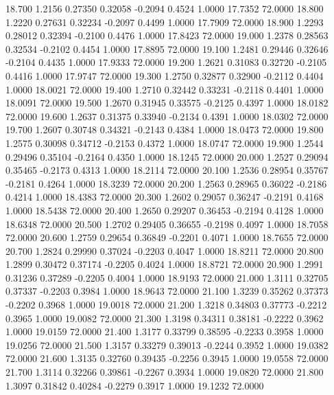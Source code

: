   18.700   1.2156   0.27350   0.32058  -0.2094   0.4524   1.0000  17.7352  72.0000
  18.800   1.2220   0.27631   0.32234  -0.2097   0.4499   1.0000  17.7909  72.0000
  18.900   1.2293   0.28012   0.32394  -0.2100   0.4476   1.0000  17.8423  72.0000
  19.000   1.2378   0.28563   0.32534  -0.2102   0.4454   1.0000  17.8895  72.0000
  19.100   1.2481   0.29446   0.32646  -0.2104   0.4435   1.0000  17.9333  72.0000
  19.200   1.2621   0.31083   0.32720  -0.2105   0.4416   1.0000  17.9747  72.0000
  19.300   1.2750   0.32877   0.32900  -0.2112   0.4404   1.0000  18.0021  72.0000
  19.400   1.2710   0.32442   0.33231  -0.2118   0.4401   1.0000  18.0091  72.0000
  19.500   1.2670   0.31945   0.33575  -0.2125   0.4397   1.0000  18.0182  72.0000
  19.600   1.2637   0.31375   0.33940  -0.2134   0.4391   1.0000  18.0302  72.0000
  19.700   1.2607   0.30748   0.34321  -0.2143   0.4384   1.0000  18.0473  72.0000
  19.800   1.2575   0.30098   0.34712  -0.2153   0.4372   1.0000  18.0747  72.0000
  19.900   1.2544   0.29496   0.35104  -0.2164   0.4350   1.0000  18.1245  72.0000
  20.000   1.2527   0.29094   0.35465  -0.2173   0.4313   1.0000  18.2114  72.0000
  20.100   1.2536   0.28954   0.35767  -0.2181   0.4264   1.0000  18.3239  72.0000
  20.200   1.2563   0.28965   0.36022  -0.2186   0.4214   1.0000  18.4383  72.0000
  20.300   1.2602   0.29057   0.36247  -0.2191   0.4168   1.0000  18.5438  72.0000
  20.400   1.2650   0.29207   0.36453  -0.2194   0.4128   1.0000  18.6348  72.0000
  20.500   1.2702   0.29405   0.36655  -0.2198   0.4097   1.0000  18.7058  72.0000
  20.600   1.2759   0.29654   0.36849  -0.2201   0.4071   1.0000  18.7655  72.0000
  20.700   1.2824   0.29990   0.37024  -0.2203   0.4047   1.0000  18.8211  72.0000
  20.800   1.2899   0.30472   0.37174  -0.2205   0.4024   1.0000  18.8721  72.0000
  20.900   1.2991   0.31236   0.37289  -0.2205   0.4004   1.0000  18.9193  72.0000
  21.000   1.3111   0.32705   0.37337  -0.2203   0.3984   1.0000  18.9643  72.0000
  21.100   1.3239   0.35262   0.37373  -0.2202   0.3968   1.0000  19.0018  72.0000
  21.200   1.3218   0.34803   0.37773  -0.2212   0.3965   1.0000  19.0082  72.0000
  21.300   1.3198   0.34311   0.38181  -0.2222   0.3962   1.0000  19.0159  72.0000
  21.400   1.3177   0.33799   0.38595  -0.2233   0.3958   1.0000  19.0256  72.0000
  21.500   1.3157   0.33279   0.39013  -0.2244   0.3952   1.0000  19.0382  72.0000
  21.600   1.3135   0.32760   0.39435  -0.2256   0.3945   1.0000  19.0558  72.0000
  21.700   1.3114   0.32266   0.39861  -0.2267   0.3934   1.0000  19.0820  72.0000
  21.800   1.3097   0.31842   0.40284  -0.2279   0.3917   1.0000  19.1232  72.0000

